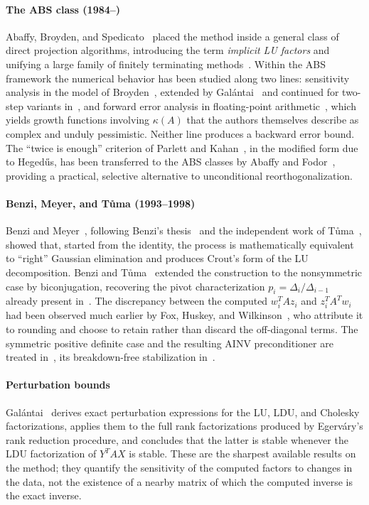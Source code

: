 \documentclass[supplement,review,onefignum,onetabnum]{siamart251216}
\begin{document}
\paragraph{The ABS class (1984--)}
Abaffy, Broyden, and Spedicato~\cite{AbaffyBS1984} placed the method inside a
general class of direct projection algorithms, introducing the term
\emph{implicit LU factors} and unifying a large family of finitely terminating
methods~\cite{AbaffySpedicato1989}. Within the ABS framework the numerical
behavior has been studied along two lines: sensitivity analysis in the model of
Broyden~\cite{Broyden1974,Broyden1985}, extended by
Gal\'antai~\cite{Galantai1991} and continued for two-step variants
in~\cite{AsadbeigiPBJ2017}, and forward error analysis in floating-point
arithmetic~\cite[Ch.~12]{AbaffySpedicato1989}, which yields growth functions
involving $\kappa(A)$ that the authors themselves describe as complex and
unduly pessimistic. Neither line produces a backward error bound. The ``twice
is enough'' criterion of Parlett and Kahan~\cite{Parlett1980}, in the modified
form due to Heged\H{u}s, has been transferred to the ABS classes by Abaffy and
Fodor~\cite{AbaffyFodor2015}, providing a practical, selective alternative to
unconditional reorthogonalization.

\paragraph{Benzi, Meyer, and T\r{u}ma (1993--1998)}
Benzi and Meyer~\cite{BenziMeyer1995}, following Benzi's
thesis~\cite{Benzi1993} and the independent work of T\r{u}ma~\cite{Tuma1993},
showed that, started from the identity, the process is mathematically
equivalent to ``right'' Gaussian elimination and produces Crout's form of the
LU decomposition. Benzi and T\r{u}ma~\cite{BenziTuma1998} extended the
construction to the nonsymmetric case by biconjugation, recovering the pivot
characterization $p_i = \Delta_i/\Delta_{i-1}$ already present
in~\cite{Hestenes1958}. The discrepancy between the computed $w_i^TAz_i$ and
$z_i^TA^Tw_i$ had been observed much earlier by Fox, Huskey, and
Wilkinson~\cite{FoxHW1948}, who attribute it to rounding and choose to retain
rather than discard the off-diagonal terms. The symmetric positive definite
case and the resulting AINV preconditioner are treated
in~\cite{BenziMeyerTuma1996}, its breakdown-free stabilization
in~\cite{BenziCullumTuma2000}.

\paragraph{Perturbation bounds}
Gal\'antai~\cite{Galantai2003,Galantai2005} derives exact perturbation
expressions for the LU, LDU, and Cholesky factorizations, applies them to the
full rank factorizations produced by Egerv\'ary's rank reduction procedure, and
concludes that the latter is stable whenever the LDU factorization of $Y^TAX$
is stable. These are the sharpest available results on the method; they
quantify the sensitivity of the computed factors to changes in the data, not
the existence of a nearby matrix of which the computed inverse is the exact
inverse.
\end{document}
